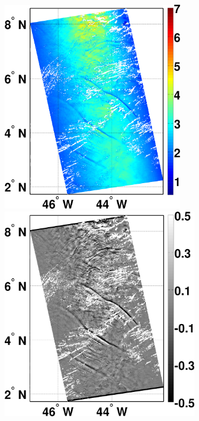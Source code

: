 \documentclass[draft,grl]{agutex}
\begin{document}
\begin{figure}
\noindent\includegraphics[width=18.5pc]{fig1a}
\hfill
\noindent\includegraphics[width=20pc]{fig1b}

\end{figure}
\end{document}

